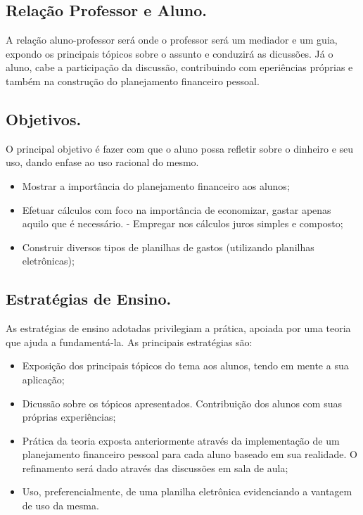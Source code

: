 \documentclass[a4paper,12pt]{article}
\begin{document}
\subsection{Relação Professor e Aluno.}

A relação aluno-professor será onde o professor será um mediador e um guia, expondo os principais tópicos sobre o assunto e conduzirá as dicussões. Já o aluno, cabe a participação da discussão, contribuindo com eperiências próprias e também na construção do planejamento financeiro pessoal.

\subsection{Objetivos.}
O principal objetivo é fazer com que o aluno possa refletir sobre o dinheiro e seu uso, dando enfase ao uso racional do mesmo.
\begin{itemize}
\item Mostrar a importância do planejamento financeiro aos alunos;
\item Efetuar cálculos com foco na importância de economizar, gastar apenas aquilo que é necessário. - Empregar nos cálculos juros simples e composto;
\item Construir diversos tipos de planilhas de gastos (utilizando planilhas eletrônicas);
\end{itemize}

\subsection{Estratégias de Ensino.}

As estratégias de ensino adotadas privilegiam a prática, apoiada por uma teoria que ajuda a fundamentá-la. As principais estratégias são:
\begin{itemize}
\item Exposição dos principais tópicos do tema aos alunos, tendo em mente a sua aplicação;
\item Dicussão sobre os tópicos apresentados. Contribuição dos alunos com suas próprias experiências;
\item Prática da teoria exposta anteriormente através da implementação de um planejamento financeiro pessoal para cada aluno baseado em sua realidade. O refinamento será dado através das discussões em sala de aula;
\item Uso, preferencialmente, de uma planilha eletrônica evidenciando a vantagem de uso da mesma.
\end{itemize}
\end{document}
